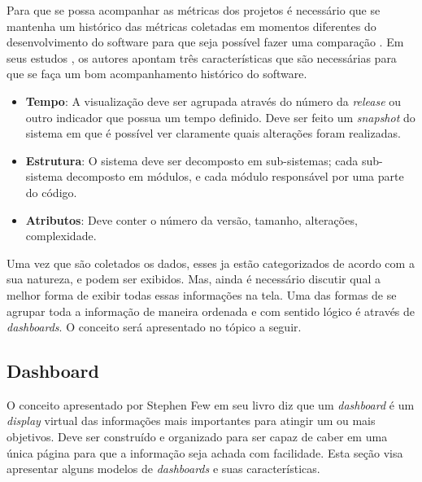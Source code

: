 Para que se possa acompanhar as métricas dos projetos é necessário que se mantenha um histórico das métricas coletadas em momentos diferentes do desenvolvimento do software para que seja possível fazer uma comparação \cite{da_silva_iavems:_2010}. Em seus estudos \cite{gracanin_software_2005}, os autores apontam três características que são necessárias para que se faça um bom acompanhamento histórico do software.
\begin{itemize}
\item \textbf{Tempo}: A visualização deve ser agrupada através do número da \textit{release} ou outro indicador que possua um tempo definido. Deve ser feito um \textit{snapshot} do sistema em que é possível ver claramente quais alterações foram realizadas.
\item \textbf{Estrutura}: O sistema deve ser decomposto em sub-sistemas; cada sub-sistema decomposto em módulos, e cada módulo responsável por uma parte do código.
\item \textbf{Atributos}: Deve conter o número da versão, tamanho, alterações, complexidade.
\end{itemize}

Uma vez que são coletados os dados, esses ja estão categorizados de acordo com a sua natureza, e podem ser exibidos. Mas, ainda é necessário discutir qual a melhor forma de exibir  todas essas informações na tela. Uma das formas de se agrupar toda a informação de maneira ordenada e com sentido lógico é através de \textit{dashboards}. O conceito será apresentado no tópico a seguir.

\subsection{Dashboard}
O conceito apresentado por Stephen Few em seu livro \cite{book_design} diz que um \textit{dashboard} é um \textit{display} virtual das informações mais importantes para atingir um ou mais objetivos. Deve ser construído e organizado para ser capaz de caber em uma única página para que a informação seja achada com facilidade. Esta seção visa apresentar alguns modelos de \textit{dashboards} e suas características.

